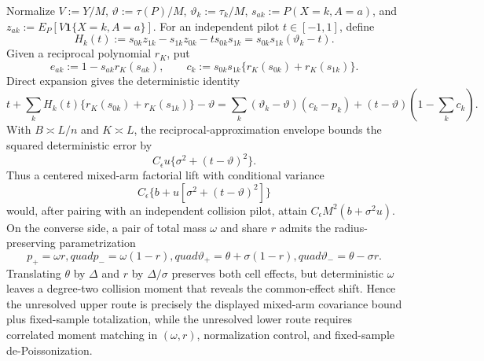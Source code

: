 Normalize \(V:=Y/M\), \(\vartheta:=\tau(P)/M\), \(\vartheta_k:=\tau_k/M\), \(s_{ak}:=P(X=k,A=a)\), and \(z_{ak}:=E_P[V\mathbf 1\{X=k,A=a\}]\).  For an independent pilot \(t\in[-1,1]\), define
\[
 H_k(t):=s_{0k}z_{1k}-s_{1k}z_{0k}-t s_{0k}s_{1k}
 =s_{0k}s_{1k}(\vartheta_k-t).
\]
Given a reciprocal polynomial \(r_K\), put
\[
 e_{ak}:=1-s_{ak}r_K(s_{ak}),
 \qquad
 c_k:=s_{0k}s_{1k}\{r_K(s_{0k})+r_K(s_{1k})\}.
\]
Direct expansion gives the deterministic identity
\[
 t+\sum_kH_k(t)\{r_K(s_{0k})+r_K(s_{1k})\}-\vartheta
 =\sum_k(\vartheta_k-\vartheta)(c_k-p_k)
 +(t-\vartheta)\left(1-\sum_kc_k\right).
\]
With \(B\asymp L/n\) and \(K\asymp L\), the reciprocal-approximation envelope bounds the squared deterministic error by
\[
 C_{\epsilon}u\{\sigma^2+(t-\vartheta)^2\}.
\]
Thus a centered mixed-arm factorial lift with conditional variance
\[
 C_{\epsilon}\{b+u[\sigma^2+(t-\vartheta)^2]\}
\]
would, after pairing with an independent collision pilot, attain \(C_{\epsilon}M^2(b+\sigma^2u)\).  On the converse side, a pair of total mass \(\omega\) and share \(r\) admits the radius-preserving parametrization
\[
 p_+=\omega r,quad p_-=\omega(1-r),quad
 \vartheta_+=\theta+\sigma(1-r),quad
 \vartheta_-=\theta-\sigma r.
\]
Translating \(\theta\) by \(\Delta\) and \(r\) by \(\Delta/\sigma\) preserves both cell effects, but deterministic \(\omega\) leaves a degree-two collision moment that reveals the common-effect shift.  Hence the unresolved upper route is precisely the displayed mixed-arm covariance bound plus fixed-sample totalization, while the unresolved lower route requires correlated moment matching in \((\omega,r)\), normalization control, and fixed-sample de-Poissonization.